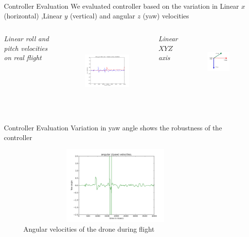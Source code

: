 \documentclass[8pt]{beamer}
\begin{document}
{{\begin{frame}{Controller Evaluation}
We evaluated controller based on the variation in Linear $x$ (horizontal) ,Linear $y$ (vertical) and angular $z$ (yaw) velocities \\[5pt]
\vspace{0.3cm}
\begin{columns}
  {\centering \small{\textit{Linear roll and pitch velocities on real flight}\par}}
  \begin{figure}
  \includegraphics[width=6cm, height=4cm]{images/cmdxy2.png}%
  \end{figure}
  {\centering \small{\textit{Linear $X Y Z$ axis}\par}}
  \begin{figure}
   \includegraphics[width=3cm, height=3cm]{images/xyzAxes.jpg}%
   \end{figure}
\end{columns}
\end{frame}

\begin{frame}{Controller Evaluation}
Variation in  yaw angle shows the robustness of the controller \\[5pt]
\begin{figure}
  \includegraphics[width=10cm, height=4cm]{images/angularyaw.png}%
  \caption{Angular velocities of the drone during flight} 
  \label{fig:cmdxy}%
\end{figure}
\end{frame}

}}
\end{document}
